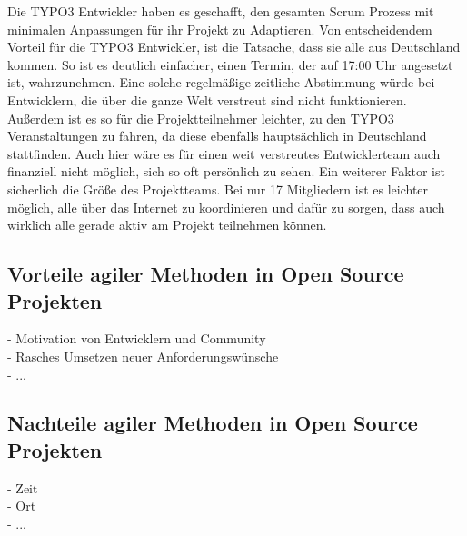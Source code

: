 Die TYPO3 Entwickler haben es geschafft, den gesamten Scrum Prozess mit minimalen Anpassungen
für ihr Projekt zu Adaptieren. Von entscheidendem Vorteil für die TYPO3 Entwickler, ist die
Tatsache, dass sie alle aus Deutschland kommen. So ist es deutlich einfacher, einen Termin, der auf
17:00 Uhr angesetzt ist, wahrzunehmen. Eine solche regelmäßige zeitliche Abstimmung würde bei
Entwicklern, die über die ganze Welt verstreut sind nicht funktionieren. Außerdem ist es so für die
Projektteilnehmer leichter, zu den TYPO3 Veranstaltungen zu fahren, da diese ebenfalls hauptsächlich
in Deutschland stattfinden. Auch hier wäre es für einen weit verstreutes Entwicklerteam
auch finanziell nicht möglich, sich so oft persönlich zu sehen. Ein weiterer Faktor ist sicherlich
die Größe des Projektteams. Bei nur 17 Mitgliedern ist es leichter möglich, alle über das Internet
zu koordinieren und dafür zu sorgen, dass auch wirklich alle gerade aktiv am Projekt
teilnehmen können.



\subsection{Vorteile agiler Methoden in Open Source Projekten}
  - Motivation von Entwicklern und Community\\
  - Rasches Umsetzen neuer Anforderungswünsche\\
  - ...
  
\subsection{Nachteile agiler Methoden in Open Source Projekten}
  - Zeit\\
  - Ort\\
  - ...


